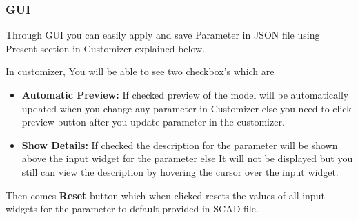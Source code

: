 \subsubsection{GUI}

Through GUI you can easily apply and save Parameter in JSON file using Present section in Customizer explained below.

In customizer, You will be able to see two checkbox’s which are
\begin{itemize}
\item \textbf{Automatic Preview:}
If checked preview of the model will be automatically updated when you change any parameter in Customizer else you need to click preview button after you update parameter in the customizer.
\item \textbf{Show Details:}
If checked the description for the parameter will be shown above the input widget for the parameter else It will not be displayed but you still can view the description by hovering the cursor over the input widget.
\end{itemize}
Then comes \textbf{Reset} button which when clicked resets the values of all input widgets for the parameter to default provided in SCAD file.

